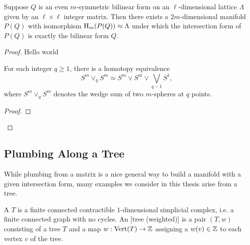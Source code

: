 \begin{theorem}
	Suppose $Q$ is an even $m$-symmetric bilinear form on an $\ell$-dimensional lattice $\Lambda$ given by an $\ell\times \ell$ integer matrix. Then there exists a $2m$-dimensional manifold $P(Q)$ with isomorphism $\operatorname{H}_{m}(P(Q))\approx \Lambda$ under which the intersection form of $P(Q)$ is exactly the bilinear form $Q$.
\end{theorem}

\begin{proof}
	Hello world


	\begin{changemargins}
	\begin{lemma}
		For each integer $q\geq 1$, there is a homotopy equivalence
		\[
			S^m\vee_q S^m \simeq S^m\vee S^m \vee \bigvee_{q-1} S^1,
		\]
		where $S^m\vee_q S^m$ denotes the wedge sum of two $m$-spheres at $q$ points.
	\end{lemma}
	\begin{proof}
	\end{proof}
	\end{changemargins}

\end{proof}

\subsection{Plumbing Along a Tree}

While plumbing from a matrix is a nice general way to build a manifold with a given intersection form, many examples we consider in this thesis arise from a tree.

\begin{definition}
	A  $T$ is a finite connected contractible $1$-dimensional simplicial complex, i.e. a finite connected graph with no cycles. An [tree (weighted)] is a pair $(T,w)$ consisting of a tree $T$ and a map $w : {\operatorname{Vert}}(T) \to \mathbb{Z}$ assigning a  $w(v)\in \mathbb{Z}$ to each vertex $v$ of the tree.
\end{definition}

